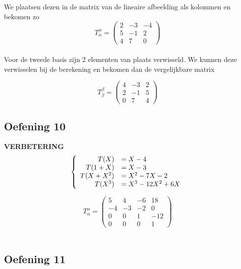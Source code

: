 \documentclass[lineaire_algebra_oplossingen.tex]{subfiles}
\begin{document}
We plaatsen dezen in de matrix van de lineaire afbeelding als kolommen en bekomen zo\\

\[
T^{\alpha}_{\alpha} =
\begin{pmatrix}
2 & -3 & -4\\
5 & -1 & 2\\
4 & 7 & 0
\end{pmatrix}
\]\\

Voor de tweede basis zijn 2 elementen van plaats verwisseld. We kunnen deze verwisselen bij de berekening en bekomen dan de vergelijkbare matrix

\[
T^{\beta}_{\beta} =
\begin{pmatrix}
4 & -3 & 2\\
2 & -1 & 5\\
0 & 7 & 4
\end{pmatrix}
\]

\subsection{Oefening 10}
\textbf{VERBETERING}
\[
\left\lbrace
\begin{array}{r l}
T(X) &= X-4\\
T(1+X) &= X-3\\
T(X+X^2) &= X^2-7X-2\\
T(X^3) &= X^3-12X^2+6X\\
\end{array}
\right.
\]

\[
T^{\alpha}_{\alpha} =
\begin{pmatrix}
5 & 4 & -6 & 18\\
-4 & -3 & -2 & 0\\
0 & 0 & 1 & -12\\
0 & 0 & 0 & 1
\end{pmatrix}
\]\\

\subsection{Oefening 11}
\end{document}
